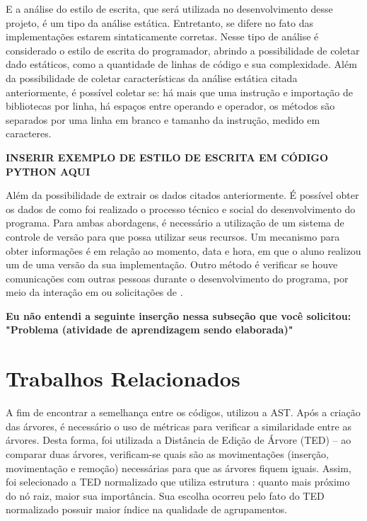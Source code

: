 			E a análise do estilo de escrita, que será utilizada no desenvolvimento desse projeto,
			é um tipo da análise estática. Entretanto, se difere no fato das implementações estarem
			sintaticamente corretas. Nesse tipo de análise é considerado o estilo de escrita do
			programador, abrindo a possibilidade de coletar dado estáticos, como a quantidade de
			linhas de código e sua complexidade. Além da possibilidade de coletar
			características da análise estática citada anteriormente, é possível coletar se:
			há mais que uma instrução e importação de bibliotecas por linha, há espaços entre
			operando e operador, os métodos são separados por uma linha em branco e tamanho
			da instrução, medido em caracteres.
			
			\textbf{INSERIR EXEMPLO DE ESTILO DE ESCRITA EM CÓDIGO PYTHON AQUI}
			
			Além da possibilidade de extrair os dados citados anteriormente. É possível
			obter os dados de como foi realizado o processo técnico e social do desenvolvimento
			do programa. Para ambas abordagens, é necessário a utilização de um sistema de
			controle de versão para que possa utilizar seus recursos. Um mecanismo para
			obter informações é em relação ao momento, data e hora, em que o aluno realizou
			um  de uma versão da sua implementação. Outro método é verificar
			se houve comunicações com outras pessoas durante o desenvolvimento do programa,
			por meio da interação em  ou solicitações de .
			
			\textbf{Eu não entendi a seguinte inserção nessa subseção que você solicitou:
				"Problema (atividade de aprendizagem sendo elaborada)"}

	\section{Trabalhos Relacionados}
	\label{sec:TrabRel}
	
	    A fim de encontrar a semelhança entre os códigos, 
	    utilizou a AST. Após a criação das árvores,
	    é necessário o uso de métricas para verificar a similaridade entre as árvores.
	    Desta forma, foi utilizada a Distância de Edição de Árvore (TED) – ao comparar
	    duas árvores, verificam-se quais são as movimentações (inserção, movimentação
	    e remoção) necessárias para que as árvores fiquem iguais. Assim, foi
	    selecionado a TED normalizado que utiliza estrutura :
	    quanto mais próximo do nó raiz, maior sua importância. Sua escolha ocorreu
	    pelo fato do TED normalizado possuir maior índice na qualidade de agrupamentos.
	    
